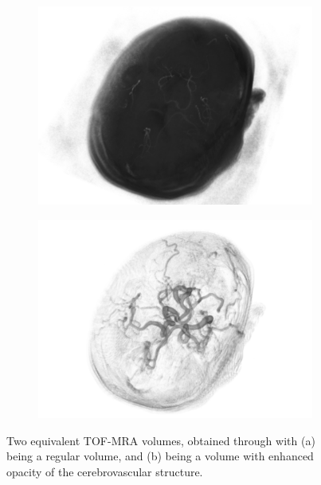 \begin{figure}[htp]
	\centering
	\begin{subfigure}{0.45\linewidth}
		\includegraphics[width=\linewidth]{figures/tof-mra-3d-noenhance.png}
		\caption{}
		\label{fig:tof-mra-3d-noenhance.png}
	\end{subfigure}
	\begin{subfigure}{0.45\linewidth}
		\includegraphics[width=\linewidth]{figures/tof-mra-3d.png}
		\caption{}
		\label{fig:tof-mra-3d.png}
	\end{subfigure}
	\caption[3D TOF-MRA volume]{Two equivalent TOF-MRA volumes, obtained through  with (a) being a regular volume, and (b) being a volume with enhanced opacity of the cerebrovascular structure.}
\end{figure}

